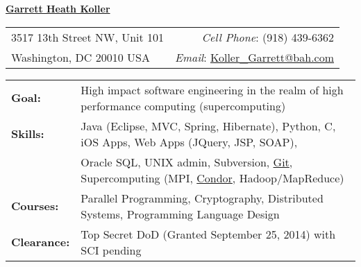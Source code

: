 \documentclass[11pt, letterpaper]{letter}
\newlength{\firstSectionSpacing}	\setlength{\firstSectionSpacing}{6pt}
\newlength{\sectionSpacing}			\setlength{\sectionSpacing}{-1pt}
\begin{document}
\sffamily

\begin{center}
\underline{\Large{\textbf{Garrett Heath Koller}}}
\end{center}
\vspace{-8pt}
\begin{tabular*}{\textwidth}{l@{\extracolsep{\fill}}r}
3517 13th Street NW, Unit 101 & \textit{Cell Phone}: (918) 439-6362 \\
Washington, DC  20010 USA & \textit{Email}:
\href{mailto:Koller_Garrett@bah.com}{Koller\_Garrett@bah.com} \\
\hline
\end{tabular*}

\vspace{\firstSectionSpacing}


\begin{tabular*}{\textwidth}{ p{2.2cm} l }
{\large \textbf{Goal:}}		& High impact software engineering in the realm of 
							  high performance computing (supercomputing) \\
{\large \textbf{Skills:}}		& Java (Eclipse, MVC, Spring, Hibernate), Python, C,
							  iOS Apps, Web Apps (JQuery, JSP, SOAP), \\
							& Oracle SQL, UNIX admin, Subversion, 
							  \href{https://github.com/garrettheath4}{Git},
							  Supercomputing (MPI, \href{http://www.htcondorproject.org/}{Condor},
							  Hadoop/MapReduce) \\
{\large \textbf{Courses:}}		& Parallel Programming, Cryptography, 
							  Distributed Systems, Programming Language Design \\
{\large \textbf{Clearance:}}	& Top Secret DoD (Granted September 25, 2014) with SCI pending
\end{tabular*}

\vspace{\firstSectionSpacing}
\vspace{\sectionSpacing}

\end{document}
